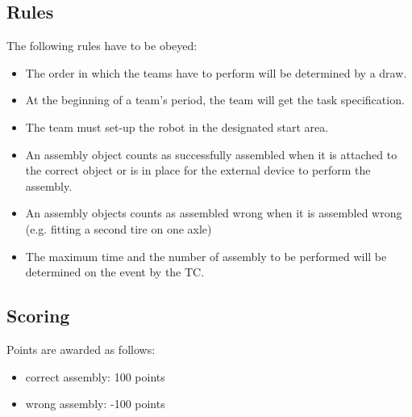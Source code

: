 \subsection{Rules}
The following rules have to be obeyed:

\begin{itemize}
\item The order in which the teams have to perform will be determined by a draw.
\item At the beginning of a team's period, the team will get the task specification. 
\item The team must set-up the robot in the designated start area.
\item An assembly object counts as successfully assembled when it is attached to the correct object or is in place for the external device to perform the assembly.
\item An assembly objects counts as assembled wrong when it is assembled wrong (e.g. fitting a second tire on one axle)
\item The maximum time and the number of assembly to be performed will be determined on the event by the TC.

\end{itemize}


\subsection{Scoring}
Points are awarded as follows:

\begin{itemize}
\item correct assembly:  \hfill 100 points
\item wrong assembly:  \hfill -100 points
\end{itemize}


